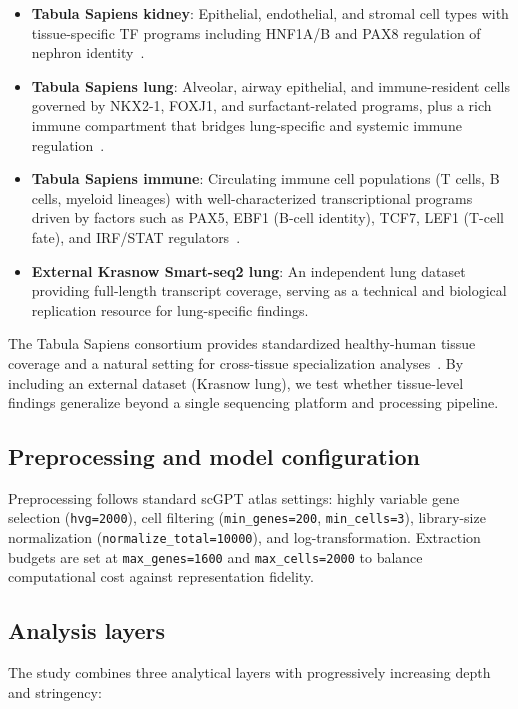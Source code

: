 \documentclass[11pt]{article}
\begin{document}
\begin{itemize}
\item \textbf{Tabula Sapiens kidney}: Epithelial, endothelial, and stromal cell types with tissue-specific TF programs including HNF1A/B and PAX8 regulation of nephron identity~\cite{jones2022tabula}.
\item \textbf{Tabula Sapiens lung}: Alveolar, airway epithelial, and immune-resident cells governed by NKX2-1, FOXJ1, and surfactant-related programs, plus a rich immune compartment that bridges lung-specific and systemic immune regulation~\cite{jones2022tabula,sikkema2023lung}.
\item \textbf{Tabula Sapiens immune}: Circulating immune cell populations (T cells, B cells, myeloid lineages) with well-characterized transcriptional programs driven by factors such as PAX5, EBF1 (B-cell identity), TCF7, LEF1 (T-cell fate), and IRF/STAT regulators~\cite{jones2022tabula}.
\item \textbf{External Krasnow Smart-seq2 lung}: An independent lung dataset providing full-length transcript coverage, serving as a technical and biological replication resource for lung-specific findings.
\end{itemize}

The Tabula Sapiens consortium provides standardized healthy-human tissue coverage and a natural setting for cross-tissue specialization analyses~\cite{jones2022tabula}. By including an external dataset (Krasnow lung), we test whether tissue-level findings generalize beyond a single sequencing platform and processing pipeline.

\subsection{Preprocessing and model configuration}
Preprocessing follows standard scGPT atlas settings: highly variable gene selection (\texttt{hvg=2000}), cell filtering (\texttt{min\_genes=200}, \texttt{min\_cells=3}), library-size normalization (\texttt{normalize\_total=10000}), and log-transformation. Extraction budgets are set at \texttt{max\_genes=1600} and \texttt{max\_cells=2000} to balance computational cost against representation fidelity.

\subsection{Analysis layers}
The study combines three analytical layers with progressively increasing depth and stringency:
\end{document}
